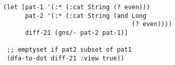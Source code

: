 \begin{lstlisting}[style=reclojureClojure]
(let [pat-1 '(:* (:cat String (? even)))
      pat-2 '(:* (:cat String (and Long
                                   (? even))))
      diff-21 (gns/- pat-2 pat-1)]

 ;; emptyset if pat2 subset of pat1
 (dfa-to-dot diff-21 :view true))
\end{lstlisting}

